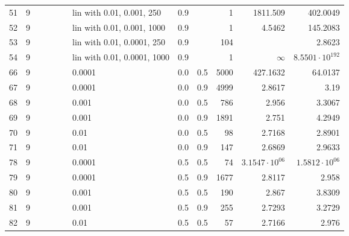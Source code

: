 \begin{longtable}{lrrrrrlrrrrr}
   51 &       9 &   &   &   &   &   lin with 0.01, 0.001, 250 &      0.9 &        &       1 &               1811.509 &               402.0049 \\
   52 &       9 &   &   &   &   &  lin with 0.01, 0.001, 1000 &      0.9 &        &       1 &                 4.5462 &               145.2083 \\
   53 &       9 &   &   &   &   &  lin with 0.01, 0.0001, 250 &      0.9 &        &     104 &                        &                 2.8623 \\
   54 &       9 &   &   &   &   & lin with 0.01, 0.0001, 1000 &      0.9 &        &       1 &               $\infty$ & $8.5501\cdot 10^{192}$ \\
   66 &       9 &   &   &   &   &                      0.0001 &      0.0 &    0.5 &    5000 &               427.1632 &                64.0137 \\
   67 &       9 &   &   &   &   &                      0.0001 &      0.0 &    0.9 &    4999 &                 2.8617 &                   3.19 \\
   68 &       9 &   &   &   &   &                       0.001 &      0.0 &    0.5 &     786 &                  2.956 &                 3.3067 \\
   69 &       9 &   &   &   &   &                       0.001 &      0.0 &    0.9 &    1891 &                  2.751 &                 4.2949 \\
   70 &       9 &   &   &   &   &                        0.01 &      0.0 &    0.5 &      98 &                 2.7168 &                 2.8901 \\
   71 &       9 &   &   &   &   &                        0.01 &      0.0 &    0.9 &     147 &                 2.6869 &                 2.9633 \\
   78 &       9 &   &   &   &   &                      0.0001 &      0.5 &    0.5 &      74 &  $3.1547\cdot 10^{06}$ &  $1.5812\cdot 10^{06}$ \\
   79 &       9 &   &   &   &   &                      0.0001 &      0.5 &    0.9 &    1677 &                 2.8117 &                  2.958 \\
   80 &       9 &   &   &   &   &                       0.001 &      0.5 &    0.5 &     190 &                  2.867 &                 3.8309 \\
   81 &       9 &   &   &   &   &                       0.001 &      0.5 &    0.9 &     255 &                 2.7293 &                 3.2729 \\
   82 &       9 &   &   &   &   &                        0.01 &      0.5 &    0.5 &      57 &                 2.7166 &                  2.976 \\

\end{longtable}
